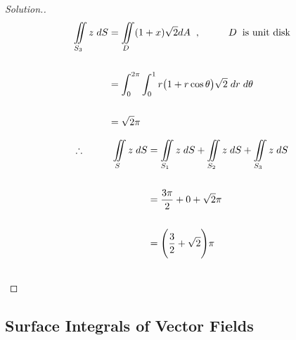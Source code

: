 \documentclass[11pt,a4paper]{article}
\theoremstyle{definition}
\newenvironment{solution}
  {\renewcommand{\qedsymbol}{}\begin{proof}[\textit{Solution}.]}
  {\end{proof}}
\begin{document}
\begin{solution}
\begin{align*}
\iint\limits_{S_3} z\hspace{0.1cm} dS & = \iint\limits_D (1+x)\sqrt{2}dA\hspace{0.2cm},\hspace{1cm} D\hspace{0.2cm}\text{is unit disk}\\\\
& = \int^{2\pi}_0\int^1_0 r\big( 1 + r\cos \theta \big) \sqrt{2}\hspace{0.1cm} dr\hspace{0.1cm} d\theta\\\\
& = \sqrt{2}\pi\\
\end{align*}

\begin{align*}
\therefore \hspace{1cm} \iint\limits_{S} z \hspace{0.1cm}dS & = \iint\limits_{S_1} z \hspace{0.1cm}dS + \iint\limits_{S_2} z \hspace{0.1cm}dS + \iint\limits_{S_3} z \hspace{0.1cm}dS\\\\
& = \frac{3\pi}{2} + 0 + \sqrt{2}\pi\\\\
& = \Bigg( \frac{3}{2}+ \sqrt{2}\Bigg)\pi\\\\
\end{align*}
\end{solution}

{\color[wave]{485}\subsection{Surface Integrals of Vector Fields}}
\end{document}
